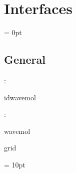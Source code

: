 
\section{Interfaces} 


\parskip = 0pt

\vspace{3mm} \subsection*{General}

: 

idwavemol
\vspace{2mm}

: 

wavemol

grid
\vspace{2mm}

\vspace{5mm}\parskip = 10pt 
